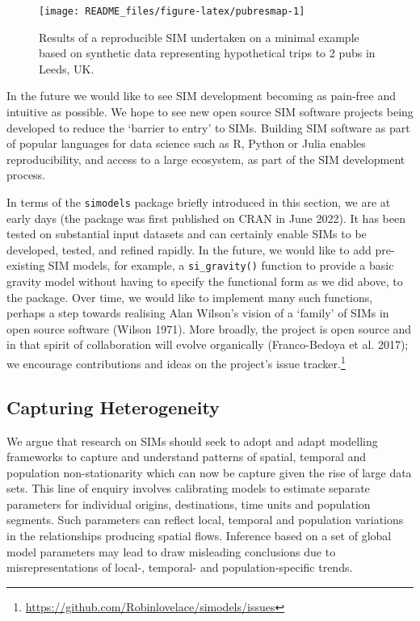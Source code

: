 \documentclass[11pt,letterpaper]{article}
\begin{document}
\begin{figure}
\texttt{[image: README\_files/figure-latex/pubresmap-1]} \caption{Results of a reproducible SIM undertaken on a minimal example based on synthetic data representing hypothetical trips to 2 pubs in Leeds, UK.}\label{fig:pubresmap}
\end{figure}

In the future we would like to see SIM development becoming as pain-free and intuitive as possible.
We hope to see new open source SIM software projects being developed to reduce the `barrier to entry' to SIMs.
Building SIM software as part of popular languages for data science such as R, Python or Julia enables reproducibility, and access to a large ecosystem, as part of the SIM development process.

In terms of the \texttt{simodels} package briefly introduced in this section, we are at early days (the package was first published on CRAN in June 2022).
It has been tested on substantial input datasets and can certainly enable SIMs to be developed, tested, and refined rapidly.
In the future, we would like to add pre-existing SIM models, for example, a \texttt{si\_gravity()} function to provide a basic gravity model without having to specify the functional form as we did above, to the package.
Over time, we would like to implement many such functions, perhaps a step towards realising Alan Wilson's vision of a `family' of SIMs in open source software (Wilson 1971).
More broadly, the project is open source and in that spirit of collaboration will evolve organically (Franco-Bedoya et al. 2017); we encourage contributions and ideas on the project's issue tracker.\footnote{\url{https://github.com/Robinlovelace/simodels/issues}}

\hypertarget{capturing-heterogeneity}{%
\subsection{Capturing Heterogeneity}\label{capturing-heterogeneity}}

We argue that research on SIMs should seek to adopt and adapt modelling frameworks to capture and understand patterns of spatial, temporal and population non-stationarity which can now be capture given the rise of large data sets.
This line of enquiry involves calibrating models to estimate separate parameters for individual origins, destinations, time units and population segments.
Such parameters can reflect local, temporal and population variations in the relationships producing spatial flows.
Inference based on a set of global model parameters may lead to draw misleading conclusions due to misrepresentations of local-, temporal- and population-specific trends.
\end{document}
